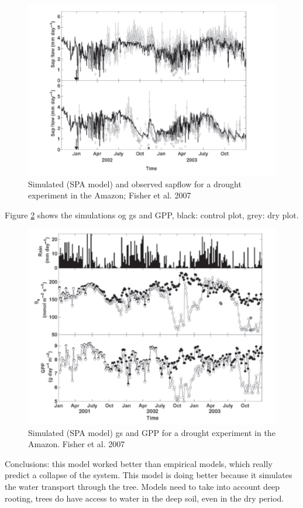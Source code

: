 \documentclass[
  12pt,
  oneside]{book}
\begin{document}
\begin{figure}

{\centering \includegraphics[width=0.8\linewidth]{figures/chap2/fisher1} 

}

\caption{Simulated (SPA model) and observed sapflow for a drought experiment in the Amazon; Fisher et al. 2007}\label{fig:f224}
\end{figure}

Figure \ref{fig:f225} shows the simulations og gs and GPP, black: control plot, grey: dry plot.

\begin{figure}

{\centering \includegraphics[width=0.8\linewidth]{figures/chap2/fisher2} 

}

\caption{Simulated (SPA model) gs and GPP for a drought experiment in the Amazon. Fisher et al. 2007}\label{fig:f225}
\end{figure}

Conclusions: this model worked better than empirical models, which really predict a collapse of the system. This model is doing better because it simulates the water transport through the tree.
Models need to take into account deep rooting, trees do have access to water in the deep soil, even in the dry period.
\end{document}
